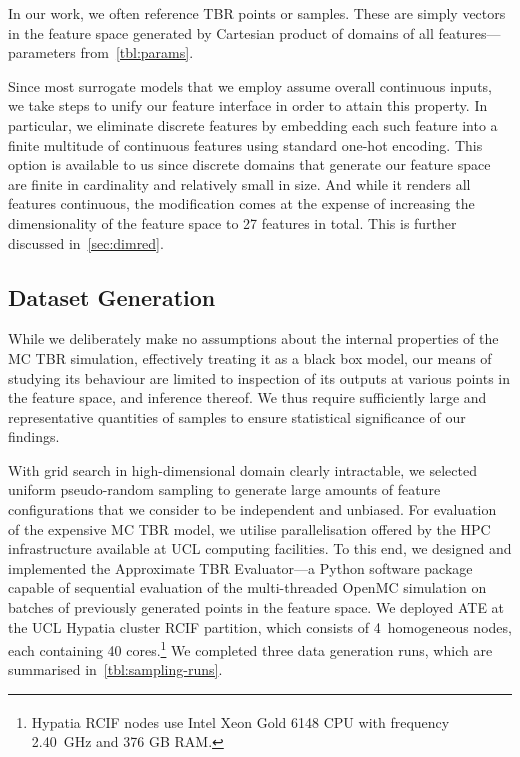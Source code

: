 In our work, we often reference TBR points or samples. These are simply vectors
in the feature space generated by Cartesian product of domains of all
features---parameters from~\cref{tbl:params}.

Since most surrogate models
that we employ assume overall continuous inputs, we take steps to unify our
feature interface in order to attain this property. In particular, we eliminate
discrete features by embedding each such feature into a finite multitude of
continuous features using standard one-hot encoding. This option is available to
us since discrete domains that generate our feature space are finite in
cardinality and relatively small in size. And while it renders all features continuous, the
modification comes at the expense of increasing the dimensionality of the
feature space to 27 features in total. This is further discussed
in~\cref{sec:dimred}.


\subsection{Dataset Generation}
\label{sec:dataset-generation}

While we deliberately make no assumptions about the internal properties of the
MC TBR simulation, effectively treating it as a black box model, our means of
studying its behaviour are limited to inspection of its outputs at various
points in the feature space, and inference thereof. We thus require
sufficiently large and representative quantities of samples to ensure
statistical significance of our findings.

With grid search in high-dimensional domain clearly intractable, we
selected uniform pseudo-random sampling to generate large amounts of feature
configurations that we consider to be independent and unbiased. For evaluation
of the expensive MC TBR model, we utilise parallelisation offered by
the HPC infrastructure available at UCL computing facilities. To this end, we
designed and implemented the Approximate TBR Evaluator---a Python software package capable of
sequential evaluation of the multi-threaded OpenMC simulation on batches of
previously generated points in the feature space.
We deployed ATE at the UCL Hypatia cluster RCIF partition, which consists of
4~homogeneous nodes, each containing 40 cores.\footnote{Hypatia RCIF nodes use
Intel\textsuperscript{\textregistered} Xeon\textsuperscript{\textregistered}
Gold 6148 CPU with frequency 2.40~GHz and 376 GB RAM.} We completed three data
generation runs, which are summarised in~\cref{tbl:sampling-runs}.

